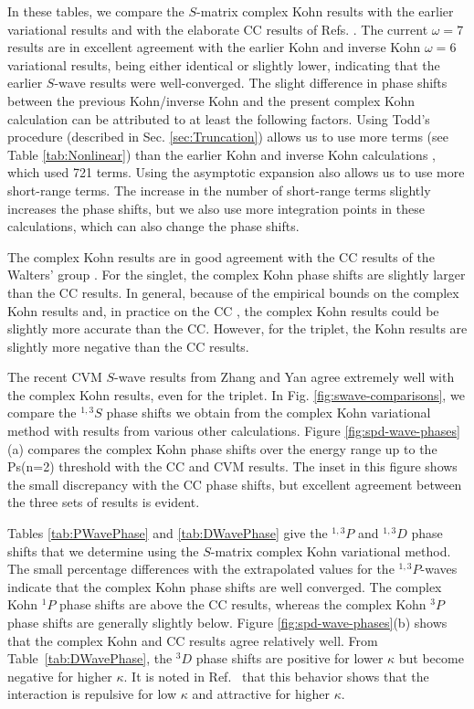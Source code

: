 \documentclass[preprint,showpacs,showkeys,preprintnumbers,amsmath,amssymb,longbibliography,pra,aps]{revtex4-1}
\begin{document}
{In these tables, we compare the $S$-matrix complex Kohn results with
the earlier variational 
results \cite{VanReeth2003,VanReeth2004} and with the elaborate CC results of 
Refs. \cite{Blackwood2002,Walters2004}. The current $\omega = 7$ results are 
in excellent agreement with the earlier Kohn and inverse Kohn $\omega = 6$ variational 
results, being either identical or slightly lower, indicating that the 
earlier $S$-wave results were well-converged. The slight difference in 
phase shifts between the previous Kohn/inverse Kohn and the
present complex Kohn calculation can be attributed 
to at least the following factors. Using Todd's procedure (described in Sec. \ref{sec:Truncation}) 
allows us to use more terms (see Table \ref{tab:Nonlinear}) than the earlier 
Kohn and inverse Kohn calculations \cite{VanReeth2003,VanReeth2004}, which used 721 terms. Using
the asymptotic expansion also allows us to use more short-range terms.
The increase in the number of short-range terms
slightly increases the phase shifts, but we also use more integration 
points in these calculations, which can also change the phase shifts. 

The complex Kohn results are in good agreement with the CC results of the 
Walters' group \cite{Blackwood2002,Walters2004}. For the singlet, the complex 
Kohn phase shifts are slightly larger than the CC results.
In general, because of the 
empirical bounds on the complex Kohn results and,
in practice on the CC \cite{Blackwood2002}, the complex Kohn results could be slightly 
more accurate than the CC. However, for the triplet,
the Kohn results are slightly more negative than the CC results.

The recent CVM $S$-wave results from Zhang and Yan \cite{Zhang2012} agree 
extremely well with the complex Kohn results, even for the triplet. In Fig.
\ref{fig:swave-comparisons},
we compare the $^{1,3}S$ phase shifts we obtain from 
the complex Kohn variational method with results from various other calculations. Figure 
\ref{fig:spd-wave-phases}(a) compares the complex Kohn phase shifts over the 
energy range up to the Ps(n=2) threshold with the CC and CVM results. The 
inset in this figure shows the small discrepancy with the CC phase shifts, 
but excellent agreement between the three sets of results is evident. 

Tables \ref{tab:PWavePhase} and \ref{tab:DWavePhase} give the $^{1,3}P$ and
$^{1,3}D$
phase shifts that we determine using the $S$-matrix complex Kohn variational 
method. The small percentage differences with the extrapolated values for the 
$^{1,3}P$-waves indicate that the complex Kohn phase shifts are well converged.
The complex Kohn $^1P$ phase shifts are above the CC
results, whereas the complex Kohn $^3P$ phase shifts are generally slightly below.
Figure \ref{fig:spd-wave-phases}(b) shows that the 
complex Kohn and CC results agree relatively well.
From Table~\ref{tab:DWavePhase}, the $^3D$ phase shifts are positive for
lower $\kappa$ but become negative for higher $\kappa$. 
It is noted in Ref.~\cite{Blackwood2002} that this behavior shows that the
interaction is repulsive for low $\kappa$ and attractive for higher $\kappa$.

}
\end{document}
